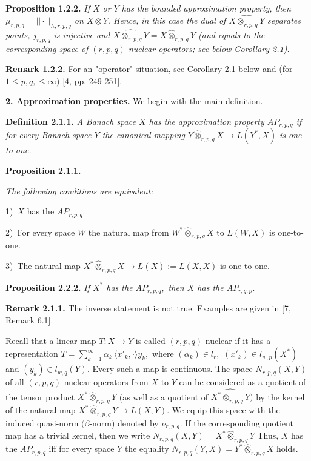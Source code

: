   \textbf{Proposition 1.2.2.}  {\it
 If $X$ or $Y$ has the bounded approximation property, then
 $\mu_{r,p,q}= ||\cdot||_{\land\!; r,p,q}$ on $X\otimes Y.$ Hence, in this case
 the dual of $\widehat{X\otimes_{r,p,q} Y}$ separates points, $j_{r,p,q}$ is injective and
 $\widehat{X\otimes_{r,p,q} Y}= X\widehat\otimes_{r,p,q} Y$ (and equals to the corresponding space of
 $(r,p,q)$-nuclear operators; see below Corollary 2.1).
 }
                              \smallskip


\textbf{Remark 1.2.2.}
For an "operator" situation, see Corollary 2.1 below
and (for $1\leqslant p,q,\leqslant \infty)$ [4, pp. 249-251].

          \bigskip


{\bf 2. Approximation properties.}
We begin with the main definition.
\smallskip

\textbf{Definition 2.1.1.} {\it
 A Banach space $X$ has the approximation property $AP_{r,p,q}$ if
 for every Banach space $Y$ the canonical map\-ping $Y\widehat\otimes_{r,p,q} X\to L(Y^*,X)$
 is one to one.
 }
 \smallskip

\textbf{Proposition 2.1.1.} {\it
  The following conditions are equivalent:

  1)\,
$X$ has the $AP_{r,p,q}.$

2)\,
For every space $W$
the natural map from $W^*\widehat\otimes_{r,p,q} X$ to $L(W,X)$ is one-to-one.

3)\,
The natural map $X^*\widehat\otimes_{r,p,q} X\to L(X):=L(X,X)$ is one-to-one.
}
        \smallskip


  \textbf{Proposition 2.2.2.} {\it
 If $X^*$ has the $AP_{r,p,q},$ then $X$ has the $AP_{r,q,p}.$
 }
             \smallskip

       \textbf{Remark 2.1.1.}
        The inverse statement is not true. Exam\-ples
     are given in [7, Remark 6.1].
             \smallskip


Recall that a linear map $T: X\to Y$ is called $(r,p,q)$-nuclear
if it has a representation $T= \sum_{k=1}^\infty \alpha_k\, \langle  x'_k, \cdot\rangle y_k,$
where $(\alpha_k)\in l_r,$ $(x'_k)\in l_{w,p}(X^*)$ and $(y_k)\in l_{w,q}(Y).$
Every such a map is continuous. The space $N_{r,p,q}(X,Y)$ of all
$(r,p,q)$-nuclear operators from $X$ to $Y$ can be considered as a quotient
of the tensor product $X^*\widehat\otimes_{r,p,q} Y$ (as well as a quotient of
$\widehat{X^*\otimes_{r,p,q} Y})$ by the kernel of the natural map
$X^*\widehat\otimes_{r,p,q} Y \to L(X,Y).$ We equip this space with the induced
quasi-norm $(\beta$-norm)
denoted by $\nu_{r,p,q}.$ If the corresponding quotient map has
a trivial kernel, then we write $N_{r,p,q}(X,Y)= X^*\widehat\otimes_{r,p,q} Y$
Thus, $X$ has the $AP_{r,p,q}$ iff for every space $Y$ the equality
 $N_{r,p,q}(Y,X)= Y^*\widehat\otimes_{r,p,q} X$ holds.
        \smallskip



